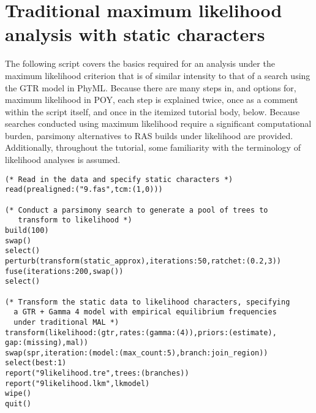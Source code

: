\section{Traditional maximum likelihood analysis with static characters}{\label{tutorial10}}
The following script covers the basics required for an analysis under the maximum likelihood criterion that is of similar intensity to that of a search using the GTR model in PhyML. Because there are many steps in, and options for, maximum likelihood in POY, each step is explained twice, once as a comment within the script itself, and once in the itemized tutorial body, below. Because searches conducted using maximum likelihood require a significant computational burden, parsimony alternatives to RAS builds under likelihood are provided. Additionally, throughout the tutorial, some familiarity with the terminology of likelihood analyses is assumed.

\begin{verbatim}
(* Read in the data and specify static characters *)
read(prealigned:("9.fas",tcm:(1,0)))

(* Conduct a parsimony search to generate a pool of trees to 
   transform to likelihood *)
build(100)
swap()
select()
perturb(transform(static_approx),iterations:50,ratchet:(0.2,3))
fuse(iterations:200,swap())
select()

(* Transform the static data to likelihood characters, specifying 
  a GTR + Gamma 4 model with empirical equilibrium frequencies 
  under traditional MAL *)
transform(likelihood:(gtr,rates:(gamma:(4)),priors:(estimate),
gap:(missing),mal))
swap(spr,iteration:(model:(max_count:5),branch:join_region))
select(best:1)
report("9likelihood.tre",trees:(branches))
report("9likelihood.lkm",lkmodel)
wipe()
quit()
\end{verbatim}

